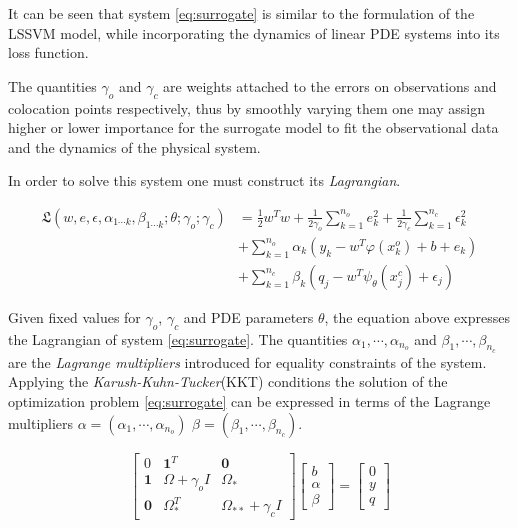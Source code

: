 \documentclass{article}
\begin{document}
It can be seen that system \ref{eq:surrogate} is similar to the
formulation of the LSSVM model, while incorporating the dynamics of
linear PDE systems into its loss function. 

The quantities $\gamma_{o}$ and $\gamma_{c}$ are weights attached to
the errors on observations and colocation points respectively, thus
by smoothly varying them one may assign higher or lower importance for
the surrogate model to fit the observational data and the dynamics of
the physical system.

In order to solve this system one must construct its
\emph{Lagrangian}.

\begin{align*}\label{eq:lag}
      \mathfrak{L}(w,e,\epsilon, \alpha_{1 \cdots k}, \beta_{1 \cdots k}; \theta; \gamma_{o}; \gamma_{c}) &= 
      \frac{1}{2} w^{T}w + \frac{1}{2\gamma_{o}} \sum_{k = 1}^{n_{o}}{e^{2}_{k}} +
      \frac{1}{2\gamma_{c}} \sum_{k = 1}^{n_{c}}{\epsilon^{2}_{k}} \\
      & + \sum_{k = 1}^{n_{o}}{\alpha_{k}(y_{k} - w^{T}\varphi(x^{o}_{k}) + b + e_{k})} \\
      & + \sum_{k = 1}^{n_{c}}{\beta_{k}(q_{j} - w^{T}\psi_{\theta}(x^{c}_{j}) + \epsilon_{j})} 
\end{align*}

Given fixed values for $\gamma_{o}$, $\gamma_{c}$ and PDE parameters
$\theta$, the equation above expresses the Lagrangian of system
\ref{eq:surrogate}. The quantities $\alpha_{1}, \cdots, \alpha_{n_{o}}$ and
$\beta_{1}, \cdots, \beta_{n_{c}}$ are the \emph{Lagrange multipliers}
introduced for equality constraints of the system. Applying the
\emph{Karush-Kuhn-Tucker}(KKT) conditions the solution of the
optimization problem \ref{eq:surrogate} can be expressed in terms of
the Lagrange multipliers $\alpha = (\alpha_{1}, \cdots, \alpha_{n_{o}})$
$\beta = (\beta_{1}, \cdots, \beta_{n_{c}})$.

\begin{equation}\label{eq:solution}
  \begin{bmatrix}
    0 & \mathbf{1}^{T} & \mathbf{0} \\ 
    \mathbf{1} & \Omega + \gamma_{o}I  & \Omega_*\\ 
    \mathbf{0} & \Omega_{*}^{T}  & \Omega_{**} + \gamma_{c}I 
  \end{bmatrix} \begin{bmatrix}
    b\\ 
    \alpha\\ 
    \beta
  \end{bmatrix} = \begin{bmatrix}
    0\\ 
    y\\ 
    q
  \end{bmatrix}
\end{equation}
\end{document}

